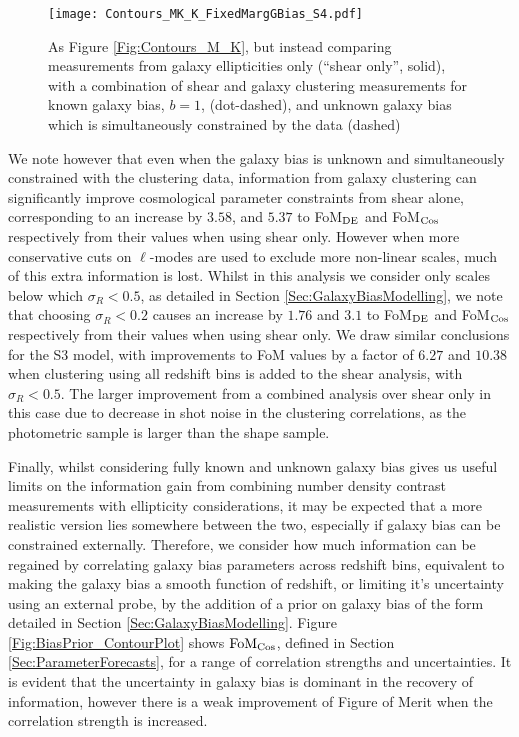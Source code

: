 \documentclass[useAMS,usenatbib,times,letter,amssymb]{mn2e}
\begin{document}
\begin{figure*}
\centering
\texttt{[image: Contours\_MK\_K\_FixedMargGBias\_S4.pdf]}
\caption{As Figure \ref{Fig:Contours_M_K}, but instead comparing measurements from galaxy ellipticities only (``shear only'', solid), with a combination of shear and galaxy clustering measurements for known galaxy bias, $b=1$, (dot-dashed), and unknown galaxy bias which is simultaneously constrained by the data (dashed)}\label{Fig:Contours_MK_K_MargFixed}
\end{figure*}

We note however that even when the galaxy bias is unknown and simultaneously constrained with the clustering data, information from galaxy clustering can significantly improve cosmological parameter constraints from shear alone, corresponding to an increase by $3.58$, and $5.37$ to FoM$_{\rm DE}$ and FoM$_{\rm Cos}$ respectively from their values when using shear only. However when more conservative cuts on $\ell$-modes are used to exclude more non-linear scales, much of this extra information is lost. Whilst in this analysis we consider only scales below which $\sigma_R < 0.5$, as detailed in Section \ref{Sec:GalaxyBiasModelling}, we note that choosing $\sigma_R < 0.2$ causes an increase by $1.76$ and $3.1$ to FoM$_{\rm DE}$ and FoM$_{\rm Cos}$ respectively from their values when using shear only. We draw similar conclusions for the S3 model, with improvements to FoM values by a factor of $6.27$ and $10.38$ when clustering using all redshift bins is added to the shear analysis, with $\sigma_R<0.5$. The larger improvement from a combined analysis over shear only in this case due to decrease in shot noise in the clustering correlations, as the photometric sample is larger than the shape sample.		

Finally, whilst considering fully known and unknown galaxy bias gives us useful limits on the information gain from combining number density contrast measurements with ellipticity considerations, it may be expected that a more realistic version lies somewhere between the two, especially if galaxy bias can be constrained externally. Therefore, we consider how much information can be regained by correlating galaxy bias parameters across redshift bins, equivalent to making the galaxy bias a smooth function of redshift, or limiting it's uncertainty using an external probe, by the addition of a prior on galaxy bias of the form detailed in Section \ref{Sec:GalaxyBiasModelling}. Figure \ref{Fig:BiasPrior_ContourPlot} shows $\rm{FoM_{Cos}}$, defined in Section \ref{Sec:ParameterForecasts}, for a range of correlation strengths and uncertainties. It is evident that the uncertainty in galaxy bias is dominant in the recovery of information, however there is a weak improvement of Figure of Merit when the correlation strength is increased. %
\end{document}
